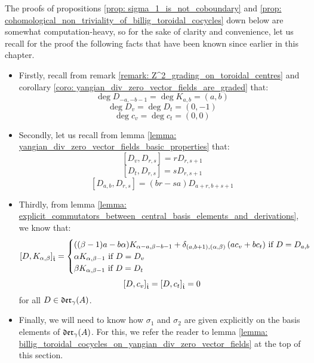         \begin{remark}
            The proofs of propositions \ref{prop: sigma_1_is_not_coboundary} and \ref{prop: cohomological_non_triviality_of_billig_toroidal_cocycles} down below are somewhat computation-heavy, so for the sake of clarity and convenience, let us recall for the proof the following facts that have been known since earlier in this chapter.
            \begin{itemize}
                \item Firstly, recall from remark \ref{remark: Z^2_grading_on_toroidal_centres} and corollary \ref{coro: yangian_div_zero_vector_fields_are_graded} that:
                    $$\deg D_{-a, -b - 1} = \deg K_{a, b} = (a, b)$$
                    $$\deg D_v = \deg D_t = (0, -1)$$
                    $$\deg c_v = \deg c_t = (0, 0)$$
                \item Secondly, let us recall from lemma \ref{lemma: yangian_div_zero_vector_fields_basic_properties} that:
                    $$[D_v, D_{r, s}] = r D_{r, s + 1}$$
                    $$[D_t, D_{r, s}] = s D_{r, s + 1}$$
                    $$[D_{a, b}, D_{r, s}] = (br - sa) D_{a + r, b + s + 1}$$
                \item Thirdly, from lemma \ref{lemma: explicit_commutators_between_central_basis_elements_and_derivations}, we know that:
                    $$[D, K_{\alpha, \beta}]_{\hat{\mathfrak{t}}} =
                        \begin{cases}
                            \text{$((\beta - 1)a - b\alpha) K_{\alpha - a, \beta - b - 1} + \delta_{(a, b + 1), (\alpha, \beta)} \left( a c_v + b c_t \right)$ if $D = D_{a, b}$}
                            \\
                            \text{$\alpha K_{\alpha, \beta - 1}$ if $D = D_v$}
                            \\
                            \text{$\beta K_{\alpha, \beta - 1}$ if $D = D_t$}
                        \end{cases}
                    $$
                    $$[D, c_v]_{\hat{\mathfrak{t}}} = [D, c_t]_{\hat{\mathfrak{t}}} = 0$$
                for all $D \in \mathfrak{der}_{\gamma}(A)$.
                \item Finally, we will need to know how $\sigma_1$ and $\sigma_2$ are given explicitly on the basis elements of $\mathfrak{der}_{\gamma}(A)$. For this, we refer the reader to lemma \ref{lemma: billig_toroidal_cocycles_on_yangian_div_zero_vector_fields} at the top of this section.
            \end{itemize}
        \end{remark}
